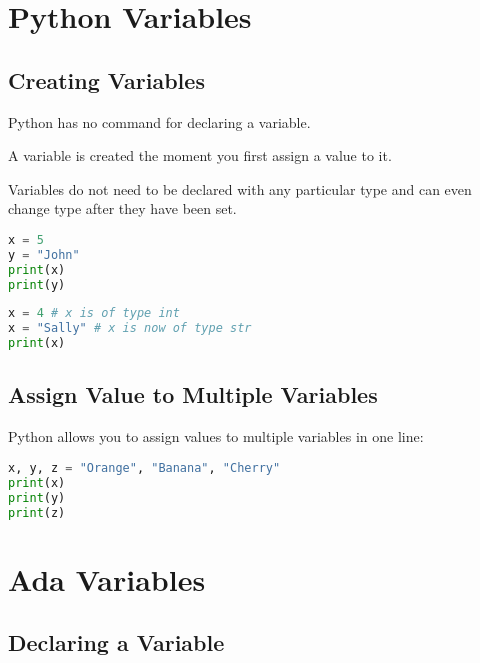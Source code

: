 \documentclass[12pt]{article}
\begin{document}
\newpage

\section{Python Variables}

\subsection{Creating Variables}

Python has no command for declaring a variable.

A variable is created the moment you first assign a value to it.

Variables do not need to be declared with any particular type and can even change type after they have been set.

\lstset{style=mystyle}
\begin{lstlisting}[language=Python, caption=Python example]
x = 5
y = "John"
print(x)
print(y)
\end{lstlisting}


\lstset{style=mystyle}
\begin{lstlisting}[language=Python, caption=Python example]
x = 4 # x is of type int
x = "Sally" # x is now of type str
print(x)
\end{lstlisting}



\subsection{Assign Value to Multiple Variables}

Python allows you to assign values to multiple variables in one line:


\lstset{style=mystyle}
\begin{lstlisting}[language=Python, caption=Python example]
x, y, z = "Orange", "Banana", "Cherry"
print(x)
print(y)
print(z)
\end{lstlisting}



\newpage

\section{Ada Variables}


\subsection{Declaring a Variable}
\end{document}
